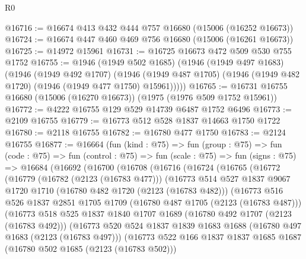 \begin{lexlean}{R0}
\begin{coremodule}
@16716 := @16674 @413 @432 @444 @757 @16680 (@15006 (@16252 @16673))
@16724 := @16674 @447 @460 @469 @756 @16680 (@15006 (@16261 @16673))
@16725 := @14972 @15961
@16731 := @16725 @16673 @472 @509 @530 @755 @1752
@16755 := @1946
    (@1949 @502 @1685)
    (@1946
      (@1949 @497 @1683)
      (@1946
        (@1949 @492 @1707)
        (@1946 (@1949 @487 @1705) (@1946 (@1949 @482 @1720) (@1946 (@1949 @477 @1750) @15961)))))
@16765 := @16731 @16755 @16680 (@15006 (@16270 @16673)) (@1975 (@1976 @509 @1752 @15961))
@16772 := @4222 @16755 @129 @529 @14739 @6487 @1752 @6496
@16773 := @2109 @16755
@16779 := @16773 @512 @528 @1837 @14663 @1750 @1722
@16780 := @2118 @16755
@16782 := @16780 @477 @1750
@16783 := @2124 @16755
@16877 := @16664
    (fun (kind : @75) =>
    fun (group : @75) =>
    fun (code : @75) =>
    fun (control : @75) =>
    fun (scale : @75) =>
    fun (signs : @75) =>
    @16684
      (@16692
        (@16700
          (@16708
            (@16716
              (@16724
                (@16765
                  (@16772
                    (@16779
                      (@16782 (@2123 (@16783 @477)))
                      (@16773
                        @514
                        @527
                        @1837
                        @9067
                        @1720
                        @1710
                        (@16780 @482 @1720 (@2123 (@16783 @482)))
                        (@16773
                          @516
                          @526
                          @1837
                          @2851
                          @1705
                          @1709
                          (@16780 @487 @1705 (@2123 (@16783 @487)))
                          (@16773
                            @518
                            @525
                            @1837
                            @1840
                            @1707
                            @1689
                            (@16780 @492 @1707 (@2123 (@16783 @492)))
                            (@16773
                              @520
                              @524
                              @1837
                              @1839
                              @1683
                              @1688
                              (@16780 @497 @1683 (@2123 (@16783 @497)))
                              (@16773
                                @522
                                @166
                                @1837
                                @1837
                                @1685
                                @1687
                                (@16780 @502 @1685 (@2123 (@16783 @502)))

\end{coremodule}
\end{lexlean}
